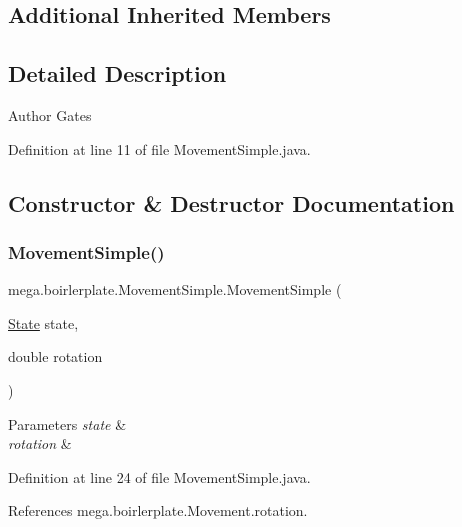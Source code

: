 \subsection*{Additional Inherited Members}


\subsection{Detailed Description}
\begin{DoxyAuthor}{Author}
Gates 
\end{DoxyAuthor}


Definition at line 11 of file Movement\+Simple.\+java.



\subsection{Constructor \& Destructor Documentation}
\mbox{\label{classmega_1_1boirlerplate_1_1_movement_simple_a91e53639e0649b8c4d60d433237fe190}} 
\subsubsection{\texorpdfstring{Movement\+Simple()}{MovementSimple()}}
{\footnotesize\ttfamily mega.\+boirlerplate.\+Movement\+Simple.\+Movement\+Simple (\begin{DoxyParamCaption}\item[{\hyperlink{classmega_1_1boirlerplate_1_1_state}{State}}]{state,  }\item[{double}]{rotation }\end{DoxyParamCaption})}


\begin{DoxyParams}{Parameters}
{\em state} & \\
\hline
{\em rotation} & \\
\hline
\end{DoxyParams}


Definition at line 24 of file Movement\+Simple.\+java.



References mega.\+boirlerplate.\+Movement.\+rotation.




